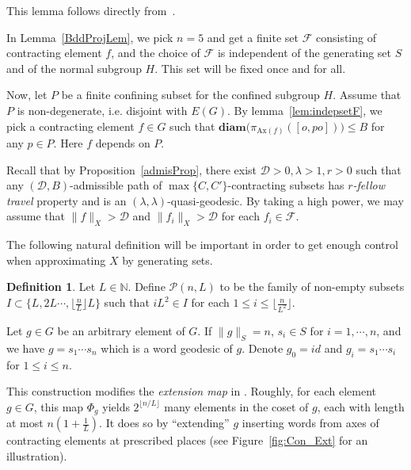 \documentclass{amsart}
\numberwithin{thm}{section}
\numberwithin{figure}{section}
\theoremstyle{definition}
\theoremstyle{definition}
\newtheorem{defn}[thm]{Definition}
\theoremstyle{remark}
\newcommand{\ax}{\mathrm{Ax}}
\newcommand{\diam }[1]{{\textbf{diam}\big(#1\big)}}
\numberwithin{equation}{section}
\theoremstyle{plain}
\begin{document}
This lemma follows directly from~\cite[Lemma 2.12 and Lemma 2.17]{Yang17:ConvexCocompact}.

In Lemma~\ref{BddProjLem}, we pick $n=5$ and get a finite set $\mathcal{F}$ consisting of contracting element $f$, and the choice of $\mathcal{F}$ is independent of the generating set $S$ and of the normal subgroup $H$. This set will be fixed once and for all.

Now, let $P$ be a finite confining subset for the confined subgroup $H$.
Assume that $P$ is non-degenerate, i.e. disjoint with $E(G)$. By lemma~\ref{lem:indepsetF}, we pick a contracting element $f\in G$ such that $\diam{\pi_{\ax(f)}([o, po])} \le B$ for any $p\in P$. Here $f$ depends on $P$.

Recall that by Proposition~\ref{admisProp}, there exist $\mathcal{D}>0, \lambda>1, r>0$ such that any $(\mathcal{D}, B)$-admissible path of $\max\{C, C'\}$-contracting subsets has \emph{$r$-fellow travel} property and is an $(\lambda, \lambda)$-quasi-geodesic. By taking a high power, we may assume that $\|f\|_X > \mathcal{D}$ and $\|f_i\|_X > \mathcal{D}$ for each $f_i\in \mathcal{F}$.


The following natural definition will be important in order to get enough control when approximating $X$ by generating sets.

\begin{defn}\label{defPSet}
	Let $L\in \mathbb{N}$. Define $\mathcal{P}(n, L)$ to be the  family of non-empty subsets $I\subset\{L, 2L \cdots, \lfloor \frac{n}{L}\rfloor L\}$ such that $iL^2\in I$ for each $1\le i\le \lfloor \frac{n}{L^2}\rfloor$. 
\end{defn}




Let $g\in G$ be an arbitrary element of $G$. If $\|g\|_S=n$, $s_i \in S$ for $i=1,\cdots,n$, and we have $g=s_1\cdots s_n$ which is a word geodesic of $g$. Denote $g_0 = id$ and $g_i = s_1 \cdots s_i$ for $1\le i\le n$.

This construction modifies the \emph{extension map} in \cite{DY24:GrowthTight}. Roughly, for each element $g \in G$, this map $\Phi_g$ yields $2^{\lfloor n/L \rfloor}$ many elements in the coset of $g$, each with length at most $n(1 + \frac{1}{L})$. It does so by ``extending'' $g$ inserting words from axes of contracting elements at prescribed places (see Figure~\ref{fig:Con_Ext} for an illustration).
\end{document}
